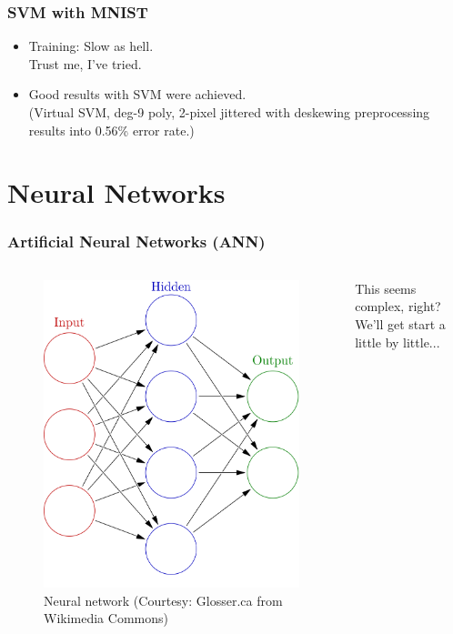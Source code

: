 \documentclass[aspectratio=169]{beamer}
\begin{document}
\begin{frame}
	\frametitle{SVM with MNIST}
	\begin{itemize}
		\item<2-> Training: Slow as hell.\\
		{\tiny Trust me, I've tried.}
		\item<3-> Good results with SVM were achieved.\\
		(Virtual SVM, deg-9 poly, 2-pixel jittered with deskewing preprocessing results into 0.56\% error rate.)
	\end{itemize}
\end{frame}

\section{Neural Networks}

\begin{frame}
	\frametitle{Artificial Neural Networks (ANN)}
	\begin{columns}
		\begin{figure}
			\includegraphics[width=0.8\linewidth,height=0.8\textheight,keepaspectratio]{imgs/ann.png}
			\caption{Neural network (Courtesy: Glosser.ca from Wikimedia Commons)}
		\end{figure}
		This seems complex, right? We'll get start a little by little...
	\end{columns}
\end{frame}
\end{document}
